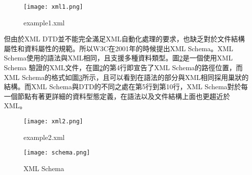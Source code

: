 \begin{figure}[H]
\centering
\graphicspath{{/Users/FUDA/Documents/masterThesis/image/}}
\texttt{[image: xml1.png]}
\caption{example1.xml}
\label{xml1}
\end{figure}

但由於XML DTD並不能完全滿足XML自動化處理的要求，也缺乏對於文件結構屬性和資料屬性的規範。所以W3C在2001年的時候提出XML Schema。XML Schema使用的語法與XML相同，且支援多種資料類型。圖\ref{xml2}是一個使用XML Schema 驗證的XML文件，在圖\ref{xml2}的第4行即宣告了XML Schema的路徑位置，而XML Schema的格式如圖\ref{schema}所示，且可以看到在語法的部分與XML相同採用巢狀的結構。而XML Schema與DTD的不同之處在第5行到第10行，XML Schema對於每一個節點有著更詳細的資料型態定義，在語法以及文件結構上面也更趨近於XML。\\\par

\begin{figure}[H]
\centering
\graphicspath{{/Users/FUDA/Documents/masterThesis/image/}}
\texttt{[image: xml2.png]}
\caption{example2.xml}
\label{xml2}
\end{figure}

\newpage

\begin{figure}[H]
\centering
\graphicspath{{/Users/FUDA/Documents/masterThesis/image/}}
\texttt{[image: schema.png]}
\caption{XML Schema}
\label{schema}
\end{figure}
\newpage
\newpage
